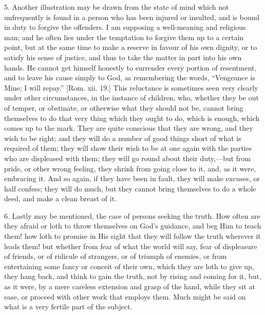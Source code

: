 5. Another illustration may be drawn from the state of mind which
not unfrequently is found in a person who has been injured or
insulted, and is bound in duty to forgive the offenders. I am
supposing a well-meaning and religious man; and he often lies under
the temptation to forgive them up to a certain point, but at the same
time to make a reserve in favour of his own dignity, or to satisfy his
sense of justice, and thus to take the matter in part into his own
hands. He cannot get himself honestly to surrender every portion of
resentment, and to leave his cause simply to God, as remembering the
words, ``Vengeance is Mine; I will repay.'' [Rom. xii. 19.]
This reluctance is sometimes seen very clearly under other
circumstances, in the instance of children, who, whether they be out
of temper, or obstinate, or otherwise what they should not be, cannot
bring themselves to do that very thing which they ought to do, which
is enough, which comes up to the mark. They are quite conscious that
they are wrong, and they wish to be right; and they will do a number
of good things short of what is required of them; they will show their
wish to be at one again with the parties who are displeased with them;
they will go round about their duty,—but from pride, or other wrong
feeling, they shrink from going close to it, and, as it were,
embracing it. And so again, if they have been in fault, they will make
excuses, or half confess; they will do much, but they cannot bring
themselves to do a whole deed, and make a clean breast of it.

6. Lastly may be mentioned, the case of persons seeking the truth.
How often are they afraid or loth to throw themselves on God's
guidance, and beg Him to teach them! how loth to promise in His sight
that they will follow the truth wherever it leads them! but whether
from fear of what the world will say, fear of displeasure of friends,
or of ridicule of strangers, or of triumph of enemies, or from
entertaining some fancy or conceit of their own, which they are loth
to give up, they hang back, and think to gain the truth, not by rising
and coming for it, but, as it were, by a mere careless extension and
grasp of the hand, while they sit at ease, or proceed with other work
that employs them. Much might be said on what is a very fertile part
of the subject.

